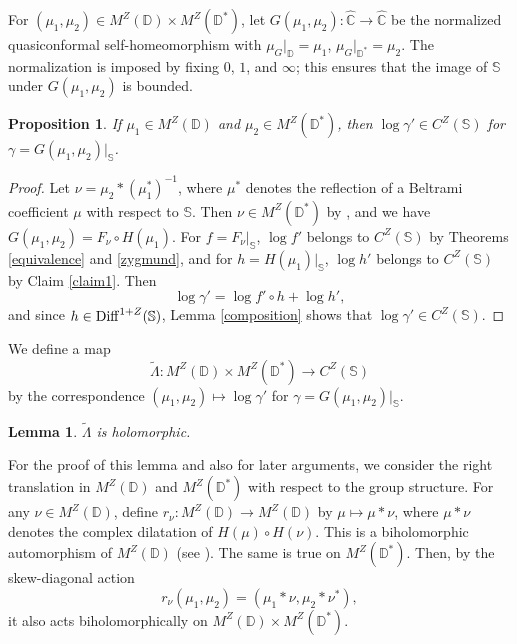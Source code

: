 \documentclass[amstex]{amsart}
\newtheorem{lemma}[theorem]{Lemma}
\newtheorem{proposition}[theorem]{Proposition}
\theoremstyle{definition}
\theoremstyle{remark}
\numberwithin{equation}{section}
\begin{document}
For $(\mu_1, \mu_2) \in M^Z(\mathbb D) \times M^Z(\mathbb D^*)$, 
let $G(\mu_1, \mu_2): \widehat{\mathbb C} \to \widehat{\mathbb C}$ be the normalized quasiconformal self-homeomorphism with 
$\mu_G|_{\mathbb D} = \mu_1$, $\mu_G|_{\mathbb D^*} = \mu_2$.
The normalization is imposed by fixing $0$, $1$, and $\infty$; this ensures that the image of $\mathbb S$
under $G(\mu_1, \mu_2)$ is bounded. 

\begin{proposition}\label{simal}
If $\mu_1 \in M^Z(\mathbb D)$ and $\mu_2 \in M^Z(\mathbb D^*)$, then
$\log \gamma' \in C^Z(\mathbb S)$ for $\gamma=G(\mu_1, \mu_2)|_{\mathbb S}$. 
\end{proposition}

\begin{proof}
Let $\nu=\mu_2 \ast (\mu_1^*)^{-1}$, where $\mu^*$ denotes the reflection of a Beltrami coefficient 
$\mu$ with respect to $\mathbb S$.
Then $\nu \in M^Z(\mathbb D^*)$ by \cite[Proposition 4]{M3}, and we have
$G(\mu_1, \mu_2)= F_{\nu} \circ H(\mu_1)$. For $f=F_{\nu}|_{\mathbb S}$, $\log f'$ belongs to $C^Z(\mathbb S)$ by
Theorems \ref{equivalence} and \ref{zygmund}, and for $h=H(\mu_1)|_{\mathbb S}$, $\log h'$ belongs to $C^Z(\mathbb S)$ by Claim \ref{claim1}.
Then
$$
\log \gamma'=\log f' \circ h +\log h',
$$
and since $h \in {\rm Diff}^{1+Z}(\mathbb S)$, Lemma \ref{composition} shows that $\log \gamma' \in C^Z(\mathbb S)$.
\end{proof}

We define a map
\begin{equation}\label{Scase}
\widetilde \Lambda:M^Z(\mathbb D) \times M^Z(\mathbb D^*) \to C^Z(\mathbb S)
\end{equation}
by the correspondence $(\mu_1, \mu_2) \mapsto \log \gamma'$
for $\gamma=G(\mu_1, \mu_2)|_{\mathbb S}$.

\begin{lemma}\label{holo}
$\widetilde \Lambda$ is holomorphic.
\end{lemma}

For the proof of this lemma and also for later arguments, we consider the right translation in
$M^Z(\mathbb D)$ and $M^Z(\mathbb D^*)$ with respect to the group structure.
For any $\nu \in M^Z(\mathbb D)$, define 
$r_{\nu}:M^Z(\mathbb D) \to M^Z(\mathbb D)$ by $\mu \mapsto \mu \ast \nu$, where $\mu \ast \nu$ denotes
the complex dilatation of $H(\mu) \circ H(\nu)$.
This is a biholomorphic automorphism of $M^Z(\mathbb D)$ (see \cite[Lemma 5]{M3}).
The same is true on $M^Z(\mathbb D^*)$.
Then, by the skew-diagonal action 
$$
r_{\nu}(\mu_1, \mu_2) = (\mu_1 \ast \nu, \mu_2 \ast \nu^*),
$$
it also acts biholomorphically on $M^Z(\mathbb D) \times M^Z(\mathbb D^*)$.
\end{document}
